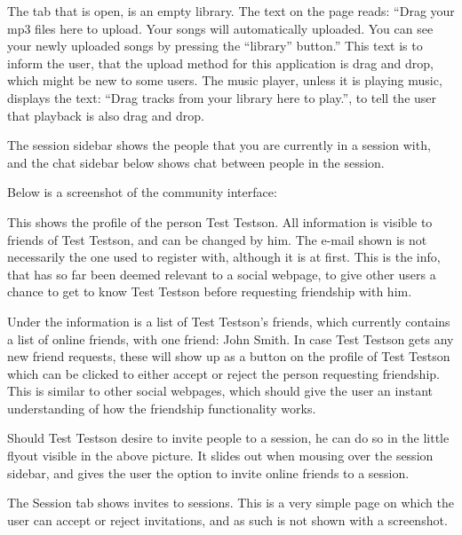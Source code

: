 \vspace{10pt}
The tab that is open, is an empty library. The text on the page reads: ``Drag your mp3 files here to upload. Your songs will
automatically uploaded. You can see your newly uploaded songs by pressing the ``library'' button.'' This text is to inform the
user, that the upload method for this application is drag and drop, which might be new to some users. The music player,
unless it is playing music, displays the text: ``Drag tracks from your library here to play.'', to tell the user that
playback is also drag and drop. 

\vspace{10pt}
The session sidebar shows the people that you are currently in a session with, and the chat sidebar below shows chat between
people in the session.

Below is a screenshot of the community interface:

\noindent{}

This shows the profile of the person Test Testson. All information is visible to friends of Test Testson, and can be changed
by him. The e-mail shown is not necessarily the one used to register with, although it is at first. This is the info, that has
so far been deemed relevant to a social webpage, to give other users a chance to get to know Test Testson before requesting
friendship with him. 

Under the information is a list of Test Testson's friends, which currently contains a list of online
friends, with one friend: John Smith. In case Test Testson gets any new friend requests, these will show up as a button on the profile of Test Testson which can be clicked to either accept or reject the person requesting friendship. This is similar to
other social webpages, which should give the user an instant understanding of how the friendship functionality works. 

\vspace{10pt}
Should Test Testson desire to invite people to a session, he can do so in the little flyout visible in the above picture. It slides out when mousing over the session sidebar, and gives the user the option to invite online friends to a session.

\vspace{10pt}
The Session tab shows invites to sessions. This is a very simple page on which the user can accept or reject invitations, and as such is not shown with a screenshot. 